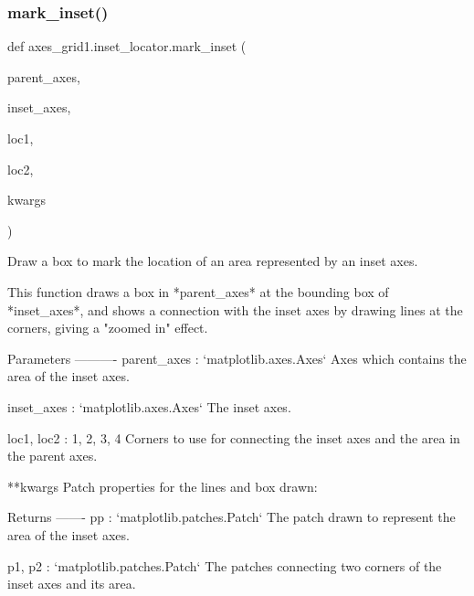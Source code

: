 \subsubsection{\texorpdfstring{mark\+\_\+inset()}{mark\_inset()}}
{\footnotesize\ttfamily def axes\+\_\+grid1.\+inset\+\_\+locator.\+mark\+\_\+inset (\begin{DoxyParamCaption}\item[{}]{parent\+\_\+axes,  }\item[{}]{inset\+\_\+axes,  }\item[{}]{loc1,  }\item[{}]{loc2,  }\item[{}]{kwargs }\end{DoxyParamCaption})}

\begin{DoxyVerb}Draw a box to mark the location of an area represented by an inset axes.

This function draws a box in *parent_axes* at the bounding box of
*inset_axes*, and shows a connection with the inset axes by drawing lines
at the corners, giving a "zoomed in" effect.

Parameters
----------
parent_axes : `matplotlib.axes.Axes`
    Axes which contains the area of the inset axes.

inset_axes : `matplotlib.axes.Axes`
    The inset axes.

loc1, loc2 : {1, 2, 3, 4}
    Corners to use for connecting the inset axes and the area in the
    parent axes.

**kwargs
    Patch properties for the lines and box drawn:


Returns
-------
pp : `matplotlib.patches.Patch`
    The patch drawn to represent the area of the inset axes.

p1, p2 : `matplotlib.patches.Patch`
    The patches connecting two corners of the inset axes and its area.
\end{DoxyVerb}
 \mbox{\label{namespaceaxes__grid1_1_1inset__locator_a30063c30f45a1a58e790506525aa97e3}} 
